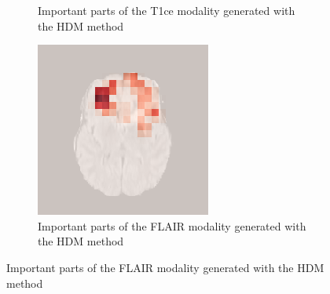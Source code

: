 \begin{figure}[H]
\begin{subfigure}[t]{.45\textwidth}
        \caption{Important parts of the T1ce modality generated with the HDM method}
    \end{subfigure}\hspace{1cm}%
    \begin{subfigure}[t]{.45\textwidth}
        \centering
        \includegraphics[width=\linewidth]{chapters/06_hdm/book/3.png}
        \caption{Important parts of the FLAIR modality generated with the HDM method}
    \end{subfigure}
\end{figure}